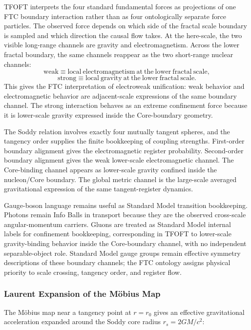 \documentclass[11pt,a4paper]{article}
\begin{document}
      TFOFT interprets the four standard fundamental forces as projections of one FTC boundary interaction rather than as four ontologically separate force particles. The observed force depends on which side of the fractal scale boundary is sampled and which direction the causal flow takes.
      At the here-scale, the two visible long-range channels are gravity and electromagnetism. Across the lower fractal boundary, the same channels reappear as the two short-range nuclear channels:
      \[
      \mathrm{weak}
      \equiv
      \mathrm{local\ electromagnetism\ at\ the\ lower\ fractal\ scale},
      \]
      \[
      \mathrm{strong}
      \equiv
      \mathrm{local\ gravity\ at\ the\ lower\ fractal\ scale}.
      \] 
      This gives the FTC interpretation of electroweak unification: weak behavior and electromagnetic behavior are adjacent-scale expressions of the same boundary channel. The strong interaction behaves as an extreme confinement force because it is lower-scale gravity expressed inside the Core-boundary geometry. 

      The Soddy relation involves exactly four mutually tangent spheres, and the tangency order supplies the finite bookkeeping of coupling strengths. First-order boundary alignment gives the electromagnetic register probability. Second-order boundary alignment gives the weak lower-scale electromagnetic channel. The Core-binding channel appears as lower-scale gravity confined inside the nucleon/Core boundary. The global metric channel is the large-scale averaged gravitational expression of the same tangent-register dynamics.

      Gauge-boson language remains useful as Standard Model transition bookkeeping. Photons remain Info Balls in transport because they are the observed cross-scale angular-momentum carriers. Gluons are treated as Standard Model internal labels for confinement bookkeeping, corresponding in TFOFT to lower-scale gravity-binding behavior inside the Core-boundary channel, with no independent separable-object role. Standard Model gauge groups remain effective symmetry descriptions of these boundary channels; the FTC ontology assigns physical priority to scale crossing, tangency order, and register flow.

    \subsubsection{Laurent Expansion of the Möbius Map}

      The Möbius map near a tangency point at $r = r_0$ gives an effective gravitational acceleration expanded around the Soddy core radius $r_s = 2GM/c^2$:
\end{document}
